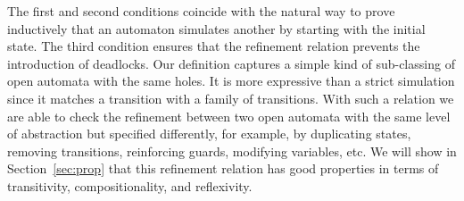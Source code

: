 \documentclass[runningheads]{llncs}
\newcommand{\xrightarrowdbl}[2][]{%
  \xrightarrow[#1]{#2}\mathrel{\mkern-14mu}\rightarrow
}
\begin{document}
The first and second conditions coincide with the natural way to prove inductively that an automaton simulates another by starting with the initial state. The third condition ensures that the refinement relation prevents the introduction of deadlocks.
Our definition captures a simple kind of sub-classing of open automata with the same holes. It is more expressive than a strict simulation since it matches a transition with a family of transitions. 
With such a relation we are able to check the refinement between two open automata with the same level of abstraction but specified differently, for example, by duplicating states, removing transitions,  reinforcing  guards, modifying variables, etc.
We will show in Section~\ref{sec:prop} that this refinement relation has good properties in terms of transitivity, compositionality, and reflexivity.



\end{document}
